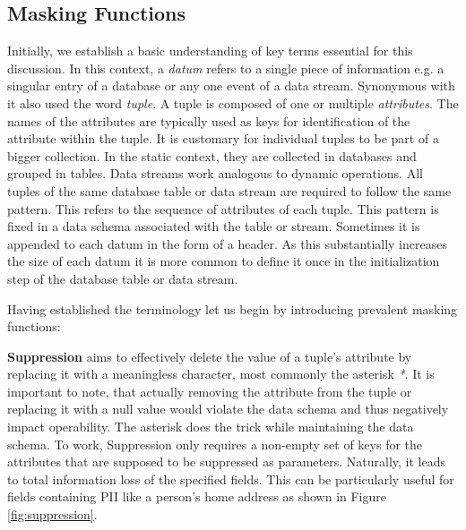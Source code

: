 \subsection{Masking Functions\label{sec:masking_functions}}
Initially, we establish a basic understanding of key terms essential for this discussion. In this context, a \textit{datum} refers to a single piece of information e.g. a singular entry of a database or any one event of a data stream. Synonymous with it also used the word \textit{tuple}. A tuple is composed of one or multiple \textit{attributes}. The names of the attributes are typically used as keys for identification of the attribute within the tuple. It is customary for individual tuples to be part of a bigger collection. In the static context, they are collected in databases and grouped in tables. Data streams work analogous to dynamic operations. All tuples of the same database table or data stream are required to follow the same pattern. This refers to the sequence of attributes of each tuple. This pattern is fixed in a data schema associated with the table or stream. Sometimes it is appended to each datum in the form of a header. As this substantially increases the size of each datum it is more common to define it once in the initialization step of the database table or data stream. \par
Having established the terminology let us begin by introducing prevalent masking functions:\par

\textbf{Suppression} aims to effectively delete the value of a tuple's attribute by replacing it with a meaningless character, most commonly the asterisk \textit{*}. It is important to note, that actually removing the attribute from the tuple or replacing it with a null value would violate the data schema and thus negatively impact operability. The asterisk does the trick while maintaining the data schema. To work, Suppression only requires a non-empty set of keys for the attributes that are supposed to be suppressed as parameters. Naturally, it leads to total information loss of the specified fields. This can be particularly useful for fields containing \ac{PII} like a person's home address as shown in Figure \ref{fig:suppression}. 

\bigskip


